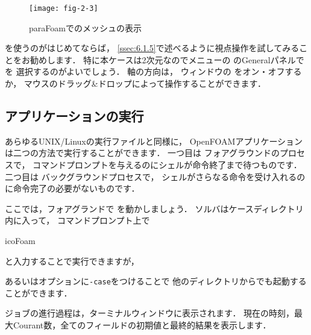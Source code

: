 \begin{figure}[ht]
 \texttt{[image: fig-2-3]}
 \caption{paraFoamでのメッシュの表示}
 \label{fig:2.3}
\end{figure}


を使うのがはじめてならば，
\autoref{ssec:6.1.5}で述べるように視点操作を試してみることをお勧めします．
特に本ケースは2次元なのでメニューの
%
%
のGeneralパネルで
%
%
を
選択するのがよいでしょう．
軸の方向は，
%
%
ウィンドウの
%
%
をオン・オフするか，
マウスのドラッグ\&ドロップによって操作することができます．


\subsection{アプリケーションの実行}
\label{ssec:2.1.3}
あらゆるUNIX/Linuxの実行ファイルと同様に，
OpenFOAMアプリケーションは二つの方法で実行することができます．
一つ目は
%
%
フォアグラウンドのプロセスで，
コマンドプロンプトを与えるのにシェルが命令終了まで待つものです．
二つ目は
%
%
バックグラウンドプロセスで，
シェルがさらなる命令を受け入れるのに命令完了の必要がないものです．

ここでは，フォアグランドで
%
%
を動かしましょう．
ソルバはケースディレクトリ内に入って，
コマンドプロンプト上で
\begin{OFverbatim}[terminal]
icoFoam
\end{OFverbatim}
と入力することで実行できますが，

あるいはオプションに\texttt{-case}をつけることで
他のディレクトリからでも起動することができます．
ジョブの進行過程は，ターミナルウィンドウに表示されます．
現在の時刻，最大Courant数，全てのフィールドの初期値と最終的結果を表示します．


